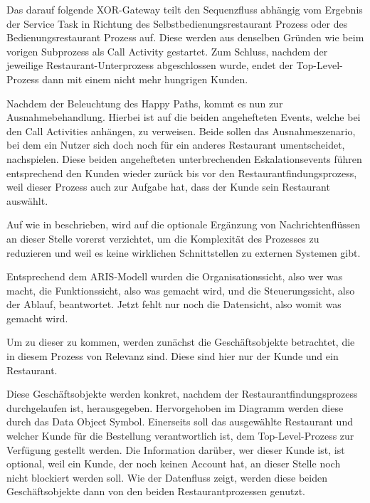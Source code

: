 Das darauf folgende XOR-Gateway teilt den Sequenzfluss abhängig vom Ergebnis der Service Task in Richtung des Selbstbedienungsrestaurant Prozess oder des Bedienungsrestaurant Prozess auf. Diese werden aus denselben Gründen wie beim vorigen Subprozess als Call Activity gestartet. Zum Schluss, nachdem der jeweilige Restaurant-Unterprozess abgeschlossen wurde, endet der Top-Level-Prozess dann mit einem nicht mehr hungrigen Kunden.

Nachdem der Beleuchtung des Happy Paths, kommt es nun zur Ausnahmebehandlung. Hierbei ist auf die beiden angehefteten Events, welche bei den Call Activities anhängen, zu verweisen. Beide sollen das Ausnahmeszenario, bei dem ein Nutzer sich doch noch für ein anderes Restaurant umentscheidet, nachspielen. Diese beiden angehefteten unterbrechenden Eskalationsevents führen entsprechend den Kunden wieder zurück bis vor den Restaurantfindungsprozess, weil dieser Prozess auch zur Aufgabe hat, dass der Kunde sein Restaurant auswählt.

Auf wie in  beschrieben, wird auf die optionale Ergänzung von Nachrichtenflüssen an dieser Stelle vorerst verzichtet, um die Komplexität des Prozesses zu reduzieren und weil es keine wirklichen Schnittstellen zu externen Systemen gibt.

Entsprechend dem ARIS-Modell wurden die Organisationssicht, also wer was macht, die Funktionssicht, also was gemacht wird, und die Steuerungssicht, also der Ablauf, beantwortet. Jetzt fehlt nur noch die Datensicht, also womit was gemacht wird. \citep[vgl.][]{lackes_aris_2025}

Um zu dieser zu kommen, werden zunächst die Geschäftsobjekte betrachtet, die in diesem Prozess von Relevanz sind. Diese sind hier nur der Kunde und ein Restaurant.

Diese Geschäftsobjekte werden konkret, nachdem der Restaurantfindungsprozess durchgelaufen ist, herausgegeben. Hervorgehoben im Diagramm werden diese durch das Data Object Symbol. Einerseits soll das ausgewählte Restaurant und welcher Kunde für die Bestellung verantwortlich ist, dem Top-Level-Prozess zur Verfügung gestellt werden. Die Information darüber, wer dieser Kunde ist, ist optional, weil ein Kunde, der noch keinen Account hat, an dieser Stelle noch nicht blockiert werden soll. Wie der Datenfluss zeigt, werden diese beiden Geschäftsobjekte dann von den beiden Restaurantprozessen genutzt.

